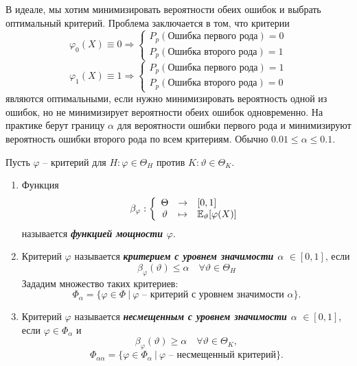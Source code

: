 \begin{rmrk}
	В идеале, мы хотим минимизировать вероятности обеих ошибок и выбрать оптимальный критерий. Проблема заключается в том, что критерии
	\[ \varphi_0(X) \equiv 0 \Rightarrow
	\left \{
	\begin{array}{cl}
	P_p(\text{Ошибка первого рода}) = 0 \\
	P_p(\text{Ошибка второго рода}) = 1
	\end{array}
	\right.
	\]
	\[ \varphi_1(X) \equiv 1 \Rightarrow
	\left \{
	\begin{array}{cl}
	P_p(\text{Ошибка первого рода}) = 1 \\
	P_p(\text{Ошибка второго рода}) = 0
	\end{array}
	\right.
	\]
	являются оптимальными, если нужно минимизировать вероятность одной из ошибок, но не минимизирует вероятности обеих ошибок одновременно. На практике берут границу $\alpha$ для вероятности ошибки первого рода и минимизируют вероятность ошибки второго рода по всем критериям. Обычно $0.01 \leq \alpha \leq 0.1$. 
\end{rmrk}

\begin{defn}
	Пусть $\varphi$ -- критерий для $H: \varphi \in \Theta_H \text{ против } K:\vartheta \in \Theta_K$.
	\begin{enumerate}
		\item Функция
		\[ \beta_\varphi:
		\left \{
		\begin{array}{ccl}
        \Theta & \rightarrow & [0, 1] \\
		\vartheta & \mapsto & \mathbb{E}_\vartheta[\varphi(X)]
		\end{array}
		\right.
		\]
		называется \textbf{\textit{функцией мощности $\varphi$}}.
		\item Критерий $\varphi$ называется \textbf{\textit{критерием с уровнем значимости $\alpha$}} $\in [0, 1]$, если
		\[ \beta_\varphi(\vartheta) \leq \alpha \quad \forall \vartheta \in \Theta_H \]
		Зададим множество таких критериев:
		\[ \Phi_\alpha = \{ \varphi \in \Phi \ |\ \varphi \text{ -- критерий с уровнем значимости }\alpha  \}. \]
		\item Критерий $\varphi$ называется \textbf{\textit{несмещенным с уровнем значимости $\alpha$}} $\in [0, 1]$, если $\varphi \in \Phi_\alpha$ и
		\[ \beta_\varphi(\vartheta) \geq \alpha \quad  \forall \vartheta \in \Theta_K, \]
		\[  \Phi_{\alpha \alpha} = \{ \varphi  \in \Phi_\alpha \ |\ \varphi \text{ -- несмещенный критерий}  \}. \]
	\end{enumerate}
\end{defn}

